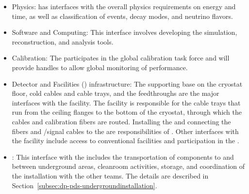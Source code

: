 \begin{itemize}
\item \dune Physics: \dual {} has interfaces with the overall physics requirements on energy and time, as well as classification of events, decay modes, and neutrino flavors.

\item Software and Computing: This interface involves developing the simulation, reconstruction, and analysis tools.

\item Calibration: The  participates in the  global calibration task force and will provide handles to allow global monitoring of  performance.

\item Detector and Facilities () infrastructure: The 
 supporting base on the cryostat floor, cold cables and cable trays, and the feedthroughs are the major interfaces with the facility. The facility is responsible for the cable trays that run from the ceiling \fdth flanges to the bottom of the cryostat, through which the cables and calibration fibers are routed.  Installing the  and connecting the fibers and /signal cables to the  are responsibilities of . Other interfaces with the facility include access to conventional facilities and participation in the .

\item {}: This interface with the  includes the transportation of  components to and between underground areas, cleanroom activities, storage, and coordination of the installation with the other teams. The details are described in Section~\ref{subsec:dp-pds-undergroundinstallation}.

\end{itemize}

